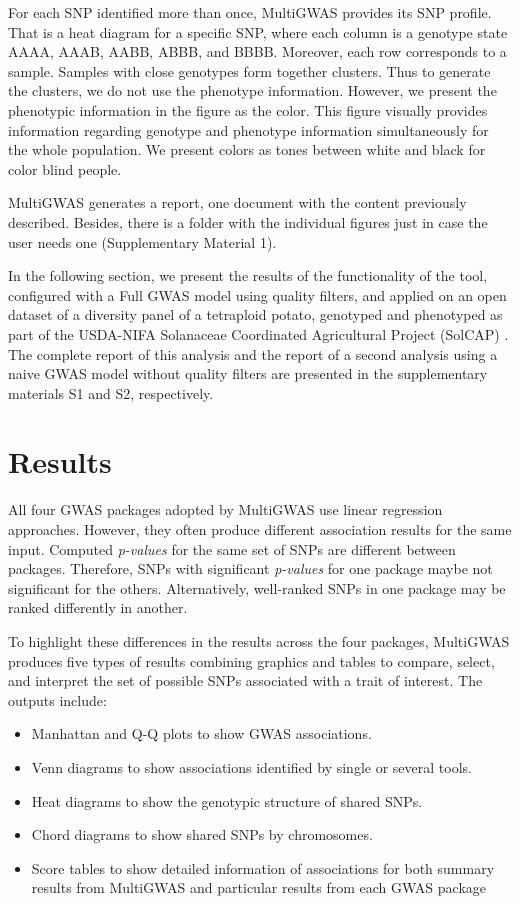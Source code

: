 \documentclass{article}
\begin{document}
For each SNP identified more than once, MultiGWAS provides its SNP profile. That is a heat diagram for a specific SNP, where each column is a genotype state AAAA, AAAB, AABB, ABBB, and BBBB. Moreover, each row corresponds to a sample. Samples with close genotypes form together clusters. Thus to generate the clusters, we do not use the phenotype information. However, we present the phenotypic information in the figure as the color. This figure visually provides information regarding genotype and phenotype information simultaneously for the whole population. We present colors as tones between white and black for color blind people.

MultiGWAS generates a report, one document with the content previously described. Besides, there is a folder with the individual figures just in case the user needs one (Supplementary Material 1). 


In the following section, we present the results of the functionality of the tool, configured with a Full GWAS model using quality filters, and applied on an open dataset of a diversity panel of a tetraploid potato, genotyped and phenotyped as part of the USDA-NIFA Solanaceae Coordinated Agricultural Project (SolCAP) \cite{Hirsch2013}. The complete report of this analysis and the report of a second analysis using a naive GWAS model without quality filters are presented in the supplementary materials S1 and S2, respectively.


\section{Results}

All four GWAS packages adopted by MultiGWAS use linear regression approaches. However, they often produce different association results for the same input. Computed \emph{p-values }for the same set of SNPs are different between packages. Therefore, SNPs with significant \emph{p-values} for one package maybe not significant for the others. Alternatively, well-ranked SNPs in one package may be ranked differently in another. 

To highlight these differences in the results across the four packages, MultiGWAS produces five types of results combining graphics and tables to compare, select, and interpret the set of possible SNPs associated with a trait of interest. The outputs include: 
\begin{itemize}
\item Manhattan and Q-Q plots to show GWAS associations. 
\item Venn diagrams to show associations identified by single or several tools.
\item Heat diagrams to show the genotypic structure of shared SNPs.
\item Chord diagrams to show shared SNPs by chromosomes.
\item Score tables to show detailed information of associations for both summary results from MultiGWAS and particular results from each GWAS
package
\end{itemize}
\end{document}

